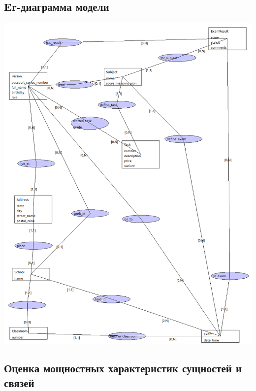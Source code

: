 \documentclass[a4paper]{article}
\begin{document}
\subsection{Er-диаграмма модели}
\includegraphics[width=14cm]{data/er.png}

\subsection{Оценка мощностных характеристик сущностей и связей}
\end{document}
